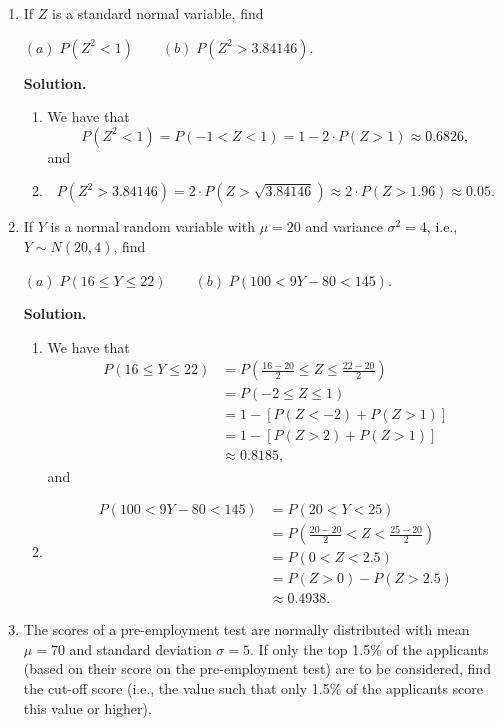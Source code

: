 \documentclass[9pt]{article}
\begin{document}
\begin{enumerate}
   \item If $Z$ is a standard normal variable, find

         $(a) \; P(Z^2 < 1) \qquad (b) \; P(Z^2 > 3.84146)$.

      \textbf{Solution.}

      \begin{enumerate}
         \item We have that
               $$P(Z^2 < 1) = P(-1 < Z < 1) = 1 - 2 \cdot P(Z > 1) \approx
                 0.6826,$$
               and
         \item $$P(Z^2 > 3.84146) = 2 \cdot P(Z > \sqrt{3.84146}) \approx
                 2 \cdot P(Z > 1.96) \approx 0.05.$$
      \end{enumerate}
   \item If $Y$ is a normal random variable with $\mu = 20$ and variance
         $\sigma^2 = 4$, i.e., $Y \sim N(20,4)$, find

         $(a) \; P(16 \le Y \le 22) \qquad (b) \; P(100 < 9Y - 80 < 145)$.

      \textbf{Solution.}

      \begin{enumerate}
         \item We have that
               \begin{align*}
                  P(16 \le Y \le 22) &= P\left(\frac{16 - 20}{2} \le
                     Z \le \frac{22 - 20}{2}\right) \\
                  &= P(-2 \le Z \le 1) \\
                  &= 1 - [P(Z < -2) + P(Z > 1)] \\
                  &= 1 - [P(Z > 2) + P(Z > 1)] \\
                  &\approx 0.8185,
               \end{align*}
               and
         \item \begin{align*}
                  P(100 < 9Y - 80 < 145) &= P(20 < Y < 25) \\
                  &= P\left(\frac{20 - 20}{2} <
                     Z < \frac{25 - 20}{2}\right) \\
                  &= P(0 < Z < 2.5) \\
                  &= P(Z > 0) - P(Z > 2.5) \\
                  &\approx 0.4938.
               \end{align*}
      \end{enumerate}
   \item The scores of a pre-employment test are normally distributed with mean
         $\mu = 70$ and standard deviation $\sigma = 5$. If only the top 1.5\%
         of the applicants (based on their score on the pre-employment test) are
         to be considered, find the cut-off score (i.e., the value such that
         only 1.5\% of the applicants score this value or higher).


\end{enumerate}
\end{document}
